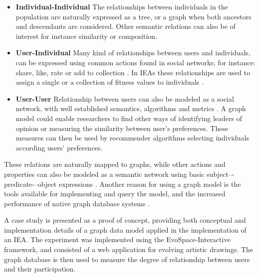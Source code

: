 \documentclass[conference]{IEEEtran}
\begin{document}
\begin{itemize}

  \item {\bf Individual-Individual} The relationships between individuals in the
  population are naturally expressed as a tree, or a graph when both ancestors 
  and descendants are considered. Other semantic relations can also be of interest
  for instance similarity or composition.


  \item {\bf User-Individual}
  Many kind of relationships between users and individuals,
  can be expressed using common actions found in social networks;
  for instance: share, like, rate or add to collection \cite{Prodromou:16:AS}. In IEAs these
  relationships are used to assign a single or a collection of
  fitness values to individuals \cite{garcia2013evospace}.   

  \item {\bf User-User}
  Relationship between users can also be modeled 
  as a social network, with well established semantics, algorithms and metrics \cite{ahuja1993network}.
  A graph model could enable researchers to find other ways of identifying leaders of 
  opinion or measuring the similarity between user's preferences. 
  These measures can then be used by recommender algorithms selecting 
  individuals according users' preferences. 

\end{itemize}

These relations are naturally mapped to graphs, while other actions and 
properties can also be modeled as a semantic network using
basic subject–-predicate-–object expressions \cite{Prud'hommeaux:14:RT}.
Another reason for using a graph model is the tools available for
implementing and query the model, and the increased performance of
native graph database systems \cite{holzschuher2013performance,holzschuher2016querying}.






 
A case study is presented as a proof of concept, providing both
conceptual and implementation details of a graph data model applied in the 
implementation of an IEA. The experiment was implemented using
the EvoSpace-Interactive framework, and consisted of a web application
for evolving artistic drawings. The graph database is then used to
measure the degree of relationship between users and their participation.  
\end{document}
